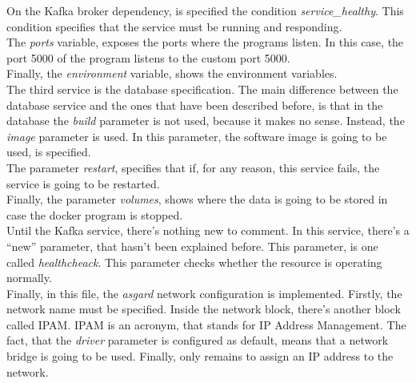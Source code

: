 \documentclass[a4paper,12pt]{article}
\begin{document}
On the Kafka broker dependency, is specified the condition \textit{service\_healthy}. This condition specifies that the service must be running and responding.\\
The \textit{ports} variable, exposes the ports where the programs listen. In this case, the port 5000 of the program listens to the custom port 5000.\\
Finally, the \textit{environment} variable, shows the environment variables.\\
The third service is the database specification. The main difference between the database service and the ones that have been described before, is that in the database the \textit{build} parameter is not used, because it makes no sense. Instead, the \textit{image} parameter is used. In this parameter, the software image is going to be used, is specified.\\
The parameter \textit{restart}, specifies that if, for any reason, this service fails, the service is going to be restarted.\\
Finally, the parameter \textit{volumes}, shows where the data is going to be stored in case the docker program is stopped.\\
Until the Kafka service, there's nothing new to comment. In this service, there's a “new” parameter, that hasn't been explained before. This parameter, is one called \textit{healthcheack}. This parameter checks whether the resource is operating normally.\\
Finally, in this file, the \textit{asgard} network configuration is implemented. Firstly, the network name must be specified. Inside the network block, there's another block called IPAM. IPAM is an acronym, that stands for IP Address Management. The fact, that the \textit{driver} parameter is configured as default, means that a network bridge is going to be used. Finally, only remains to assign an IP address to the network.
\end{document}
